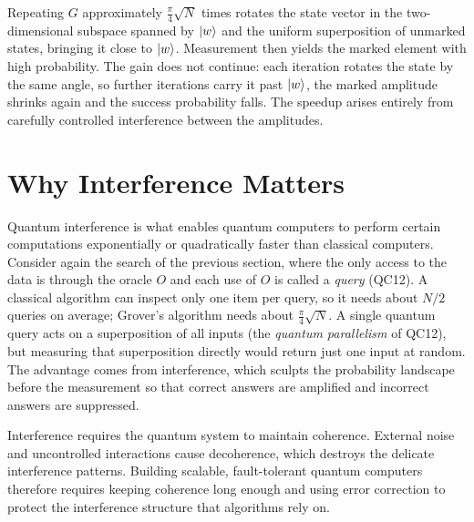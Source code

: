 \documentclass[a4paper,11pt]{article}
\providecommand{\ket}[1]{\mathinner{|{#1}\rangle}}
\begin{document}
Repeating $G$ approximately $\frac{\pi}{4}\sqrt{N}$ times rotates the state vector in the
two-dimensional subspace spanned by $\ket{w}$ and the uniform superposition of unmarked states,
bringing it close to $\ket{w}$. Measurement then yields the marked element with high probability.
The gain does not continue: each iteration rotates the state by the same angle, so further iterations
carry it past $\ket{w}$, the marked amplitude shrinks again and the success probability falls.
The speedup arises entirely from carefully controlled interference between the amplitudes.

\section*{Why Interference Matters}

Quantum interference is what enables quantum computers to perform certain computations
exponentially or quadratically faster than classical computers. Consider again the search of the
previous section, where the only access to the data is through the oracle $O$ and each use of $O$ is
called a \emph{query} (QC12). A classical algorithm can inspect only one item per query, so it needs
about $N/2$ queries on average; Grover's algorithm needs about $\frac{\pi}{4}\sqrt{N}$. A single quantum
query acts on a superposition of all inputs (the \emph{quantum parallelism} of QC12), but measuring
that superposition directly would return just one input at random. The advantage comes from
interference, which sculpts the probability landscape before the measurement so that correct
answers are amplified and incorrect answers are suppressed.

Interference requires the quantum system to maintain coherence. External noise and uncontrolled
interactions cause decoherence, which destroys the delicate interference patterns. Building
scalable, fault-tolerant quantum computers therefore requires keeping coherence long enough and
using error correction to protect the interference structure that algorithms rely on.
\end{document}
